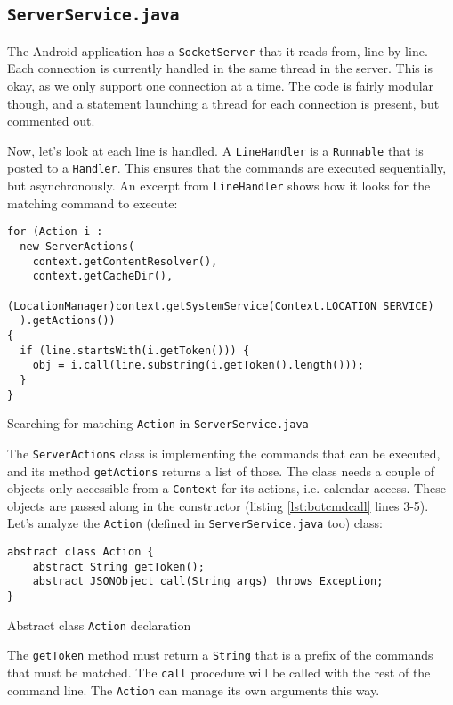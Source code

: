 \documentclass[a4paper]{report}
\newcommand{\classname}[1]{\texttt{#1}}
\newcommand{\methodname}[1]{\texttt{#1}}
\newcommand{\filename}[1]{\texttt{#1}}
\begin{document}
{\subsection{\filename{ServerService.java}}
The Android application has a \classname{SocketServer} that it reads from, line by line. Each connection is currently handled in the same thread in the server. This is okay, as we only support one connection at a time. The code is fairly modular though, and a statement launching a thread for each connection is present, but commented out.

Now, let's look at each line is handled. A \classname{LineHandler} is a \classname{Runnable} that is posted to a \classname{Handler}. This ensures that the commands are executed sequentially, but asynchronously. An excerpt from \classname{LineHandler} shows how it looks for the matching command to execute:
\begin{listing}[H]
\begin{verbatim}
for (Action i :
  new ServerActions(
    context.getContentResolver(),
    context.getCacheDir(),
    (LocationManager)context.getSystemService(Context.LOCATION_SERVICE)
  ).getActions())
{
  if (line.startsWith(i.getToken())) {
    obj = i.call(line.substring(i.getToken().length()));
  }
}
\end{verbatim}
\caption{Searching for matching \classname{Action} in \filename{ServerService.java}}
\label{lst:botcmdcall}
\end{listing}

The \classname{ServerActions} class is implementing the commands that can be executed, and its method \methodname{getActions} returns a list of those. The class needs a couple of objects only accessible from a \classname{Context} for its actions, i.e. calendar access. These objects are passed along in the constructor (listing \ref{lst:botcmdcall} lines 3-5). Let's analyze the \classname{Action} (defined in \filename{ServerService.java} too) class:
\begin{listing}[H]
\begin{verbatim}
abstract class Action {
	abstract String getToken();
	abstract JSONObject call(String args) throws Exception;
}
\end{verbatim}
\caption{Abstract class \classname{Action} declaration}
\label{lst:actiondecl}
\end{listing}

The \methodname{getToken} method must return a \classname{String} that is a prefix of the commands that must be matched. The \methodname{call} procedure will be called with the rest of the command line. The \classname{Action} can manage its own arguments this way.

}
\end{document}
